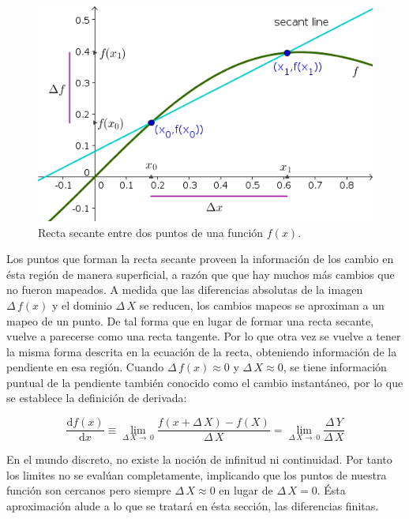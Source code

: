 \documentclass[letterpaper,10pt,oneside]{sphinxmanual}
\theoremstyle{plain}%
\theoremstyle{definition}%
\theoremstyle{remark}%
\begin{document}
\begin{figure}[h]
\centering
\includegraphics[scale=2]{Figures/F1.png}
\caption{Recta secante entre dos puntos de una función $f(x)$.}
\label{F1}
\end{figure}

Los puntos que forman la recta secante proveen la información de los cambio en ésta región de manera superficial, a razón que que hay muchos más cambios que no fueron mapeados. A medida que las diferencias absolutas de la imagen $\Delta\,f(x)$ y el dominio $\Delta\,X$ se reducen, los cambios mapeos se aproximan a un mapeo de un punto. De tal forma que en lugar de formar una recta secante, vuelve a parecerse como una recta tangente. Por lo que otra vez se vuelve a tener la misma forma descrita en la ecuación de la recta, obteniendo información de la pendiente en esa región. Cuando $\Delta\,f(x)\approx0$ y $\Delta\,X\approx0$, se tiene información puntual de la pendiente también conocido como el cambio instantáneo, por lo que se establece la definición de derivada:

\begin{equation}
\frac{\mathrm{d}f(x)}{\mathrm{d}x} \equiv \lim\limits_{\Delta\,X\rightarrow\,0}\frac{f(x + \Delta\,X) - f(X)}{\Delta\,X} = \lim\limits_{\Delta\,X\rightarrow\,0}\frac{\Delta\,Y}{\Delta\,X}
\end{equation}

En el mundo discreto, no existe la noción de infinitud ni continuidad. Por tanto los limites no se evalúan completamente, implicando que los puntos de nuestra función son cercanos pero siempre $\Delta\,X\approx0$ en lugar de $\Delta\,X=0$. Ésta aproximación alude a lo que se tratará en ésta sección, las diferencias finitas.\medskip
\end{document}
